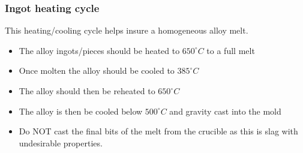 \subsubsection{Ingot heating cycle}

This heating/cooling cycle helps insure a homogeneous alloy melt.
\begin{itemize}
\item The \MgZnCa alloy ingots/pieces should be heated to $650^{\circ}C$ to a full melt
\item Once molten the alloy should be cooled to $385^{\circ}C$
\item The alloy should then be reheated to $650^{\circ}C$
\item The alloy is then be cooled below $500^{\circ}C$ and gravity cast into the mold
\item Do NOT cast the final bits of the melt from the crucible as this is slag with undesirable properties. 
\end{itemize}